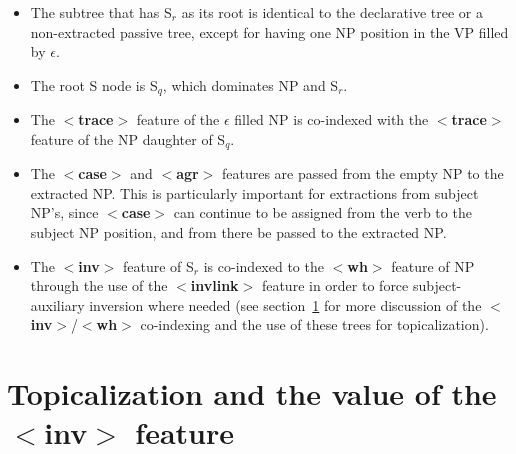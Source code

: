 \begin{itemize} 
\item The subtree that has S$_{r}$ as its root is identical to the 
  declarative tree or a non-extracted passive tree, except for having 
  one NP position in the VP filled by $\epsilon$. 
 
\item The root S node is S$_{q}$, which dominates NP and S$_{r}$. 
  
\item The {\bf $<$trace$>$} feature of the $\epsilon$ filled NP is 
  co-indexed with the {\bf $<$trace$>$} feature of the NP daughter of 
  S$_{q}$. 
 
\item The {\bf $<$case$>$} and {\bf $<$agr$>$} features are passed 
  from the empty NP to the extracted NP.  This is particularly 
  important for extractions from subject NP's, since {\bf $<$case$>$} 
  can continue to be assigned from the verb to the subject NP 
  position, and from there be passed to the extracted NP. 
  
\item The {\bf $<$inv$>$} feature of S$_{r}$ is co-indexed to the {\bf     $<$wh$>$} feature of NP through the use of the {\bf $<$invlink$>$} 
  feature in order to force subject-auxiliary inversion where needed 
  (see section~\ref{topicalization} for more discussion of the {\bf     $<$inv$>$}/{\bf$<$wh$>$} co-indexing and the use of these trees 
  for topicalization). 
 
\end{itemize} 
 
 
 
\section{Topicalization and the value of the {\bf $<$inv$>$} feature} 
\label{topicalization} 
 
